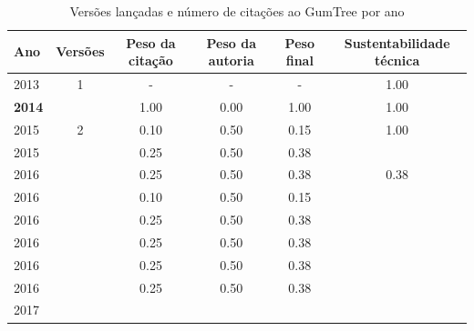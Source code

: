 \begin{table}[H]
\caption{Versões lançadas e número de citações ao GumTree por ano}
\centering
\begin{tabular}{| l | c | c | c | c | c |}
  \hline
  Ano & Versões & Peso da citação & Peso da autoria & Peso final & Sustentabilidade técnica \\
  \hline
        2013 & 1 & - & - & -
        &
          {\color{blue} 1.00}
        \\
\hline
            {\bf 2014}
          &
          
          &
          1.00
          &
          0.00
          &
          1.00
          &
            {\color{blue} 1.00}
          \\
\hline
            2015
          &
          2
          &
          0.10
          &
          0.50
          &
          0.15
          &
            {\color{blue} 1.00}
          \\
            2015
          &
          
          &
          0.25
          &
          0.50
          &
          0.38
          &
          \\
\hline
            2016
          &
          
          &
          0.25
          &
          0.50
          &
          0.38
          &
            {\color{red} 0.38}
          \\
            2016
          &
          
          &
          0.10
          &
          0.50
          &
          0.15
          &
          \\
            2016
          &
          
          &
          0.25
          &
          0.50
          &
          0.38
          &
          \\
            2016
          &
          
          &
          0.25
          &
          0.50
          &
          0.38
          &
          \\
            2016
          &
          
          &
          0.25
          &
          0.50
          &
          0.38
          &
          \\
            2016
          &
          
          &
          0.25
          &
          0.50
          &
          0.38
          &
          \\
\hline
            2017
          &
          

\end{tabular}
\end{table}
